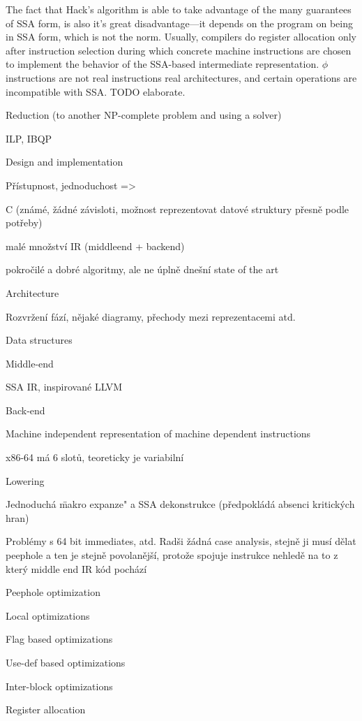 The fact that Hack's algorithm is able to take advantage of the many guarantees
of SSA form, is also it's great disadvantage---it depends on the program on
being in SSA form, which is not the norm. Usually, compilers do register
allocation only after instruction selection during which concrete machine
instructions are chosen to implement the behavior of the SSA-based intermediate
representation. $\phi$ instructions are not real instructions real
architectures, and certain operations are incompatible with SSA. TODO elaborate.

\seccc Reduction (to another NP-complete problem and using a solver)

ILP, IBQP

\chap Design and implementation

Přístupnost, jednoduchost =>

C (známé, žádné závisloti, možnost reprezentovat datové struktury přesně podle
potřeby)

malé množství IR (middleend + backend)

pokročilé a dobré algoritmy, ale ne úplně dnešní state of the art


\sec Architecture

Rozvržení fází, nějaké diagramy, přechody mezi reprezentacemi atd.

\sec Data structures

\secc Middle-end

SSA IR, inspirované LLVM

\secc Back-end

Machine independent representation of machine dependent instructions

x86-64 má 6 slotů, teoreticky je variabilní

\sec Lowering

Jednoduchá \"makro expanze" a SSA dekonstrukce (předpokládá absenci kritických
hran)

Problémy s 64 bit immediates, atd. Radši žádná case analysis, stejně ji musí
dělat peephole a ten je stejně povolanější, protože spojuje instrukce nehledě na
to z který middle end IR kód pochází

\sec Peephole optimization

\secc Local optimizations

\secc Flag based optimizations

\secc Use-def based optimizations

\secc Inter-block optimizations

\sec Register allocation

